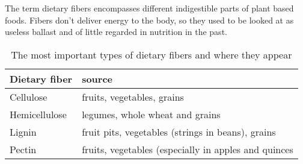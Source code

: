 \documentclass[../main.tex]{subfiles}
\begin{document}
The term dietary fibers\label{chap:fibers} encompasses different indigestible parts of plant based foods.
Fibers don't deliver energy to the body, so they used to be looked at as useless ballast and of little regarded in nutrition in the past.

\begin{table}[htb!]
  \centering
  \begin{tabular}{ll}
    \textbf{Dietary fiber} & \textbf{source} \\
    \hline
    Cellulose & fruits, vegetables, grains \\
    Hemicellulose & legumes, whole wheat and grains \\
    Lignin & fruit pits, vegetables (strings in beans), grains \\
    Pectin & fruits, vegetables (especially in apples and quinces \\
  \end{tabular}
  \caption[Dietary fibers]{The most important types of dietary fibers and where they appear}
\end{table}
\end{document}
